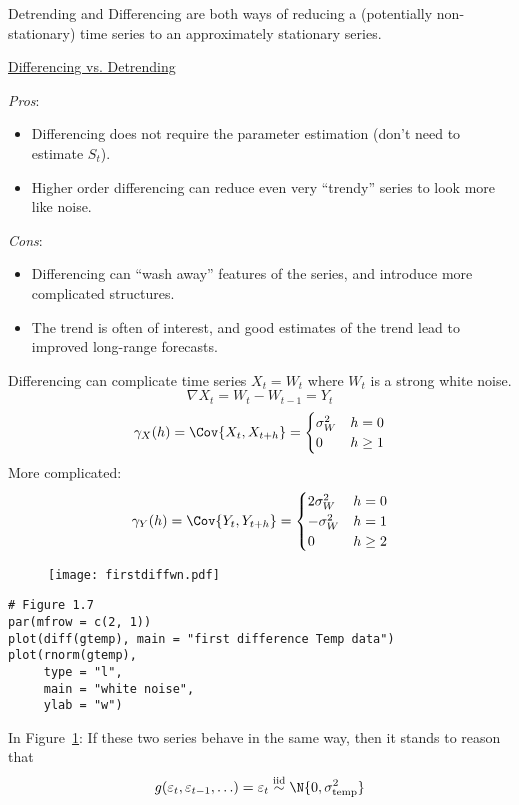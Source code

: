 Detrending and Differencing are both ways of reducing a
(potentially non-stationary) time series
to an approximately stationary series.

\underline{Differencing vs. Detrending}

\emph{Pros}:
\begin{itemize}
    \item Differencing does not require the parameter estimation
          (don't need to estimate $ S_t $).
    \item Higher order differencing can reduce even very
          ``trendy'' series to look more like noise.
\end{itemize}
\emph{Cons}:
\begin{itemize}
    \item Differencing can ``wash away'' features of the series,
          and introduce more complicated structures.
    \item The trend is often of interest, and good estimates
          of the trend lead to improved long-range forecasts.
\end{itemize}
\begin{Example}{Differencing can complicate time series}{}
    $ X_t=W_t $ where $ W_t $ is a strong white noise.
    \[ \nabla X_t=W_t-W_{t-1}=Y_t \]
    \[ \gamma_X(h)=\Cov{X_t,X_{t+h}}=\begin{cases}
            \sigma_W^2 & h=0    \\
            0          & h\ge 1
        \end{cases} \]
    More complicated:
    \[ \gamma_Y(h)=\Cov{Y_t,Y_{t+h}}=\begin{cases}
            2\sigma_W^2 & h=0    \\
            -\sigma_W^2 & h=1    \\
            0           & h\ge 2
        \end{cases} \]
\end{Example}
\begin{figure}[!ht]
    \centering
    \texttt{[image: firstdiffwn.pdf]}\label{fig:firstdiffwn}
\end{figure}
\begin{verbatim}
# Figure 1.7
par(mfrow = c(2, 1))
plot(diff(gtemp), main = "first difference Temp data")
plot(rnorm(gtemp),
     type = "l",
     main = "white noise",
     ylab = "w")    
\end{verbatim}
In Figure~\ref{fig:firstdiffwn}: If these two series behave in
the same way, then it stands to reason that
\[ g(\varepsilon_t,\varepsilon_{t-1},\ldots)=\varepsilon_t
    \stackrel{\text{iid}}{\sim}\N{0,\sigma^2_{\text{temp}}} \]
